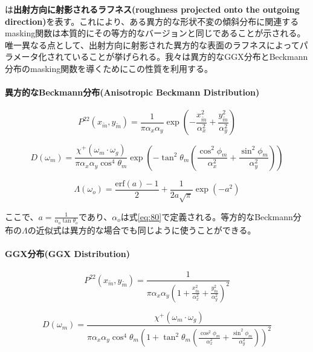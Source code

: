 \documentclass[a4j,xelatex,ja=standard]{bxjsarticle}
\begin{document}
は\textbf{出射方向に射影されるラフネス(roughness projected onto the outgoing direction)}を表す。これにより、ある異方的な形状不変の傾斜分布に関連するmasking関数は本質的にその等方的なバージョンと同じであることが示される。唯一異なる点として、出射方向に射影された異方的な表面のラフネスによってパラメータ化されていることが挙げられる。我々は異方的なGGX分布とBeckmann分布のmasking関数を導くためにこの性質を利用する。

\paragraph{異方的なBeckmann分布(Anisotropic Beckmann Distribution)}

\begin{equation}
    P^{22}(x_{\tilde{m}}, y_{\tilde{m}}) = \frac{1}{\pi \alpha_x \alpha_y} \exp\left( -\frac{x_{\tilde{m}}^2}{\alpha^2_x} + \frac{y_{\tilde{m}}^2}{\alpha^2_y} \right)
    \label{eq:81}
\end{equation}

\begin{equation}
    D(\omega_m) = \frac{\chi^+(\omega_m \cdot \omega_g)}{\pi \alpha_x \alpha_y \cos^4 \theta_m} \exp\left( -\tan^2 \theta_m \left( \frac{\cos^2 \phi_m}{\alpha^2_x} + \frac{\sin^2 \phi_m}{\alpha^2_y} \right) \right)
    \label{eq:82}
\end{equation}

\begin{equation}
    \Lambda(\omega_o) = \frac{\text{erf}(a) - 1}{2} + \frac{1}{2a \sqrt{\pi}} \exp(-a^2)
    \label{eq:83}
\end{equation}

ここで、$a = \frac{1}{\alpha_o \tan\theta_o}$であり、$\alpha_o$は式\eqref{eq:80}で定義される。等方的なBeckmann分布の$\Lambda$の近似式は異方的な場合でも同じように使うことができる。

\paragraph{GGX分布(GGX Distribution)}

\begin{equation}
    P^{22}(x_{\tilde{m}}, y_{\tilde{m}}) = \frac{1}{\pi\alpha_x \alpha_y \left(1 +  \frac{x_{\tilde{m}}^2}{\alpha^2_x} + \frac{y_{\tilde{m}}^2}{\alpha^2_y} \right)^2}
    \label{eq:84}
\end{equation}

\begin{equation}
    D(\omega_m) = \frac{\chi^+(\omega_m \cdot \omega_g)}{\pi \alpha_x \alpha_y \cos^4 \theta_m \left( 1 + \tan^2 \theta_m \left( \frac{\cos^2 \phi_m}{\alpha^2_x} + \frac{\sin^2 \phi_m}{\alpha^2_y} \right) \right)^2}
    \label{eq:85}
\end{equation}
\end{document}
